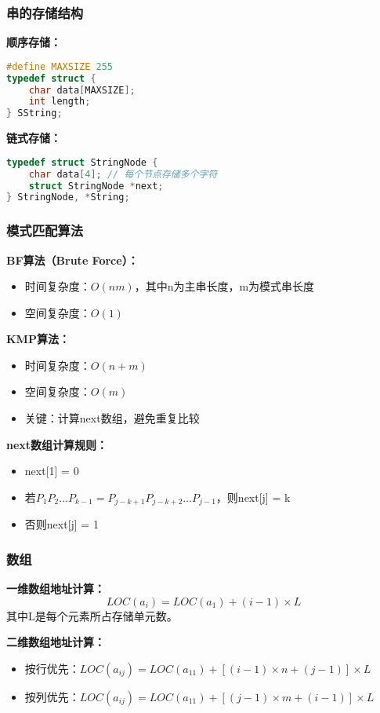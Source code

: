 \documentclass[12pt,a4paper]{amsart}
\begin{document}
\subsubsection{串的存储结构}

\textbf{顺序存储：}
\begin{lstlisting}[language=C++]
#define MAXSIZE 255
typedef struct {
    char data[MAXSIZE];
    int length;
} SString;
\end{lstlisting}

\textbf{链式存储：}
\begin{lstlisting}[language=C++]
typedef struct StringNode {
    char data[4]; // 每个节点存储多个字符
    struct StringNode *next;
} StringNode, *String;
\end{lstlisting}

\subsubsection{模式匹配算法}

\textbf{BF算法（Brute Force）：}
\begin{itemize}
\item 时间复杂度：$O(nm)$，其中n为主串长度，m为模式串长度
\item 空间复杂度：$O(1)$
\end{itemize}

\textbf{KMP算法：}
\begin{itemize}
\item 时间复杂度：$O(n+m)$
\item 空间复杂度：$O(m)$
\item 关键：计算next数组，避免重复比较
\end{itemize}

\textbf{next数组计算规则：}
\begin{itemize}
\item next[1] = 0
\item 若$P_1P_2\ldots P_{k-1} = P_{j-k+1}P_{j-k+2}\ldots P_{j-1}$，则next[j] = k
\item 否则next[j] = 1
\end{itemize}

\subsubsection{数组}

\textbf{一维数组地址计算：}
$$LOC(a_i) = LOC(a_1) + (i-1) \times L$$
其中L是每个元素所占存储单元数。

\textbf{二维数组地址计算：}
\begin{itemize}
\item 按行优先：$LOC(a_{ij}) = LOC(a_{11}) + [(i-1) \times n + (j-1)] \times L$
\item 按列优先：$LOC(a_{ij}) = LOC(a_{11}) + [(j-1) \times m + (i-1)] \times L$
\end{itemize}
\end{document}
